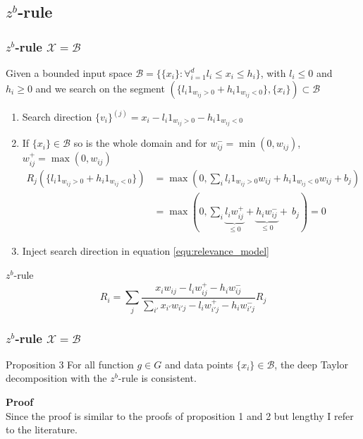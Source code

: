 \documentclass{beamer}
\begin{document}
\subsection[$z^b$-rule]{$z^b$-rule}


\begin{frame}
\frametitle{$z^b$-rule $\mathcal{X}=\mathcal{B}$}
\vspace{0.4cm}
Given a bounded input space $\mathcal{B} = \{\{x_i\} : \forall_{i=1}^d l_i\leq x_i \leq h_i\} $, with $l_i \leq 0$ and $ h_i \geq 0$ and we search on the segment $(\{l_i 1_{w_{ij}>0} + h_i 1_{w_{ij}<0}\},\{x_i\})\subset \mathcal{B}$\\
\begin{enumerate}
	\item Search direction $\{v_i\}^{(j)} = x_i - l_i 1_{w_{ij}>0} - h_i 1_{w_{ij}<0}$
	\item If $\{x_i\} \in \mathcal{B}$ so is the whole domain and for $w_{ij}^-=\min(0,w_{ij})$, $w_{ij}^+=\max(0,w_{ij})$
	\vspace{-0.25cm}
	\begin{align*}
		R_j(\{l_i 1_{w_{ij}>0} + h_i 1_{w_{ij}<0}\}) &= \max(0, \sum_i l_i 1_{w_{ij}>0} w_{ij} + h_i 1_{w_{ij}<0} w_{ij} + b_j)\\
		&=\max(0, \sum_i \underbrace{l_i w_{ij}^+}_{\leq 0} + \underbrace{h_i w_{ij}^-}_{\leq 0} +\  b_j)= 0
	\end{align*}
	\vspace{-0.75cm}
	\item Inject search direction in equation \eqref{equ:relevance_model}
\end{enumerate}

\pause
\vspace{-0.15cm}
\begin{block}{$z^b$-rule}
\begin{equation*}
R_i =  \sum_j \frac{x_i w_{ij} - l_i w_{ij}^+ - h_i w_{ij}^-}{\sum_{i'} x_{i'} w_{i'j}  - l_i w_{i'j}^+ - h_i w_{i'j}^-} R_j
\end{equation*}
\end{block}
\end{frame}



\begin{frame}
\frametitle{$z^b$-rule $\mathcal{X}=\mathcal{B}$}
\vspace{-0.4cm}
\begin{block}{Proposition 3}
For all function $g \in G$ and data points $\{x_i\} \in \mathcal{B}$, the deep Taylor decomposition with the $z^b$-rule is consistent.
\end{block}
\vspace{0.5cm}
\textbf{Proof}\\
Since the proof is similar to the proofs of proposition 1 and 2 but lengthy I refer to the literature.

\end{frame}
\end{document}
